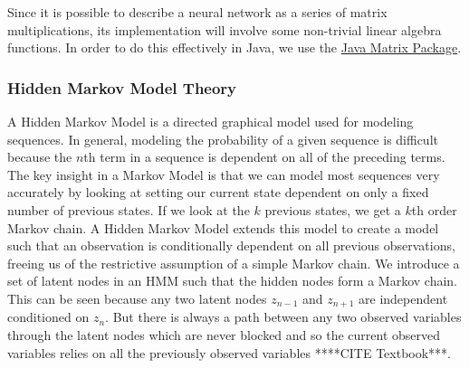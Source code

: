 \documentclass[11pt,a4paper,twocolumn]{article}
\begin{document}
Since it is possible to describe a neural network as a series of matrix multiplications, its
implementation will involve some non-trivial linear algebra functions. In order to do this
effectively in Java, we use the \href{http://math.nist.gov/javanumerics/jama/}{Java Matrix Package}.


\subsubsection*{Hidden Markov Model Theory}

A Hidden Markov Model is a directed graphical model used for modeling sequences.
In general, modeling the probability of a given sequence is difficult because
the $n$th term in a sequence is dependent on all of the preceding terms. The key
insight in a Markov Model is that we can model most sequences very accurately
by looking at setting our current state dependent on only a fixed number of previous
states. If we look at the $k$ previous states, we get a $k$th order Markov chain.
A Hidden Markov Model extends this model to create a model such that an observation
is conditionally dependent on all previous observations, freeing us of the restrictive
assumption of a simple Markov chain. We introduce a set of latent nodes in an HMM such
that the hidden nodes form a Markov chain. This can be seen because any two latent nodes
$z_{n-1}$ and $z_{n+1}$ are independent conditioned on $z_n$. But there is always a path between any two
observed variables through the latent nodes which are never blocked and so the current
observed variables relies on all the previously observed variables ****CITE Textbook***.
\end{document}
